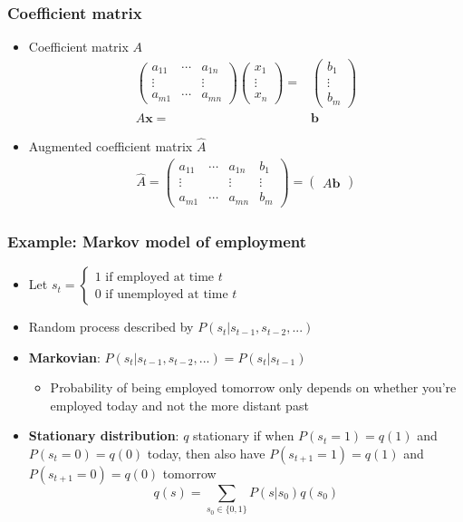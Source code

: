\documentclass[compress]{beamer}
\theoremstyle{definition}
\begin{document}
\begin{frame}
  \frametitle{Coefficient matrix}
  \begin{itemize}
  \item Coefficient matrix $A$
    \begin{align*}
      \begin{pmatrix} a_{11} &  \cdots & a_{1n} \\
        \vdots & & \vdots \\
        a_{m1} & \cdots & a_{mn} 
      \end{pmatrix} 
      \begin{pmatrix} x_1 \\ \vdots \\ x_n
      \end{pmatrix} = & \begin{pmatrix} b_1 \\ \vdots \\ b_m
      \end{pmatrix} \\
      A \mathbf{x} = & \mathbf{b}
    \end{align*}
  \item Augmented coefficient matrix $\hat{A}$
    \begin{align*}
      \hat{A} =   \begin{pmatrix} a_{11} &  \cdots & a_{1n} & b_1 \\
        \vdots & & \vdots & \vdots \\
        a_{m1} & \cdots & a_{mn} & b_m 
      \end{pmatrix}  = \begin{pmatrix} A \mathbf{b}
      \end{pmatrix}
    \end{align*}
  \end{itemize}
\end{frame}

\begin{frame}
  \frametitle{Example: Markov model of employment}
  \begin{itemize}
  \item Let $s_t = \begin{cases} 1 \text{ if employed at time } t \\
      0 \text{ if unemployed at time } t
    \end{cases}$
  \item Random process described by $P(s_t | s_{t-1}, s_{t-2}, ... )$
  \item \textbf{Markovian}: $P(s_t | s_{t-1}, s_{t-2}, ... ) = P(s_t |
    s_{t-1})$
    \begin{itemize}
    \item Probability of being employed tomorrow only depends on
      whether you're employed today and not the more distant past
    \end{itemize}
  \item \textbf{Stationary distribution}: $q$ stationary if when $P(s_t = 1) = q(1)$ and $P(s_t
    = 0) = q(0)$ today, then also have $P(s_{t+1} = 1) = q(1)$ and
    $P(s_{t+1}=0) = q(0)$ tomorrow 
    \[ q(s) = \sum_{s_0 \in \{0, 1\} } P(s | s_0) q(s_0) \]
  \end{itemize}
\end{frame}
\end{document}
